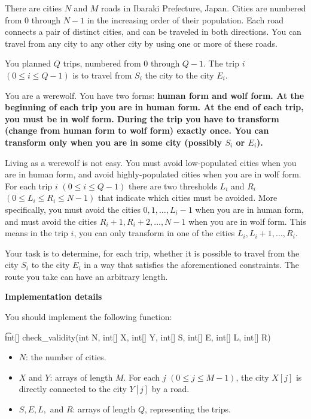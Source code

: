 There are cities $N$ and $M$ roads in Ibaraki Prefecture, Japan. Cities are numbered from $0$ through $N-1$ in the increasing order of their population. Each road connects a pair of distinct cities, and can be traveled in both directions. You can travel from any city to any other city by using one or more of these roads.

You planned $Q$ trips, numbered from $0$ through $Q-1$. The trip $i$ $(0 \le i \le Q-1)$ is to travel from $S_i$ the city to the city $E_i$.

You are a werewolf. You have two forms: \bf{human form} and \bf{wolf form}. At the beginning of each trip you are in human form. At the end of each trip, you must be in wolf form. During the trip you have to \bf{transform} (change from human form to wolf form) exactly once. You can transform only when you are in some city (possibly $S_i$ or $E_i$).

Living as a werewolf is not easy. You must avoid low-populated cities when you are in human form, and avoid highly-populated cities when you are in wolf form. For each trip $i$ $(0 \le i \le Q-1)$ there are two thresholds $L_i$ and $R_i$ $(0 \le L_i \le R_i \le N-1)$ that indicate which cities must be avoided. More specifically, you must avoid the cities $0, 1,  \dots , L_i-1$ when you are in human form, and must avoid the cities $R_i+1, R_i+2, \dots ,N-1$ when you are in wolf form. This means in the trip $i$, you can only transform in one of the cities $L_i, L_i+1, \dots , R_i.$

Your task is to determine, for each trip, whether it is possible to travel from the city $S_i$ to the city $E_i$ in a way that satisfies the aforementioned constraints. The route you take can have an arbitrary length.

\bf{Implementation details}

You should implement the following function:

\t{int[] check_validity(int N, int[] X, int[] Y, int[] S, int[] E, int[] L, int[] R)}

\begin{itemize}
\item $N$: the number of cities. 
\item $X$ and $Y$: arrays of length $M$. For each $j$ $(0 \le j \le M-1)$, the city $X[j]$ is directly connected to the city $Y[j]$ by a road. 
\item $S, E, L,$ and $R$: arrays of length $Q$, representing the trips.
\end{itemize}


